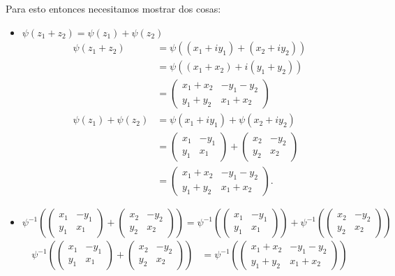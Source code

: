 \documentclass{report}
\begin{document}
\begin{enumerate}
\begin{itemize}
	Para esto entonces necesitamos mostrar dos cosas:
	\begin{itemize}
	  \item $\psi\left( z_1 + z_2 \right) = \psi\left( z_1 \right) + \psi\left( z_2 \right) $
	    \begin{align*}
	      \psi\left( z_1 + z_2 \right) &= \psi\left( \left( x_1 + iy_1 \right) + \left( x_2 + iy_2 \right)  \right) \\
	      &= \psi\left( \left( x_1+x_2 \right) + i \left( y_1 + y_2 \right)  \right)  \\
	      &= \begin{pmatrix} x_1+x_2 & -y_1-y_2 \\ y_1+y_2 & x_1+x_2  \end{pmatrix}  \\
	      \psi\left( z_1 \right) + \psi\left( z_2 \right) &= \psi\left( x_1+iy_1 \right) + \psi\left( x_2+iy_2 \right)  \\
	      &= \begin{pmatrix} x_1 & -y_1 \\ y_1 & x_1 \end{pmatrix} + \begin{pmatrix} x_2 & -y_2 \\ y_2 & x_2 \end{pmatrix}  \\
	      &= \begin{pmatrix} x_1+x_2 & -y_1-y_2 \\ y_1+y_2 & x_1+x_2 \end{pmatrix}
	    .\end{align*}
	  \item $\psi^{-1}\left( \begin{pmatrix} x_1 & -y_1 \\ y_1 & x_1 \end{pmatrix}  + \begin{pmatrix} x_2 & -y_2 \\ y_2 & x_2 \end{pmatrix} \right) = \psi^{-1}\left( \begin{pmatrix} x_1 & -y_1 \\ y_1 & x_1 \end{pmatrix}  \right) + \psi^{-1}\left( \begin{pmatrix} x_2 & -y_2 \\ y_2 & x_2 \end{pmatrix}  \right)  $
	    \begin{align*}
	      \psi^{-1}\left(\begin{pmatrix} x_1 & -y_1 \\ y_1 & x_1 \end{pmatrix} + \begin{pmatrix} x_2 & -y_2 \\ y_2 & x_2 \end{pmatrix}   \right) &= \psi^{-1}\left( \begin{pmatrix} x_1+x_2 & -y_1-y_2 \\ y_1+y_2 & x_1+x_2 \end{pmatrix}  \right)  \\

\end{align*}
\end{itemize}
\end{itemize}
\end{enumerate}
\end{document}
